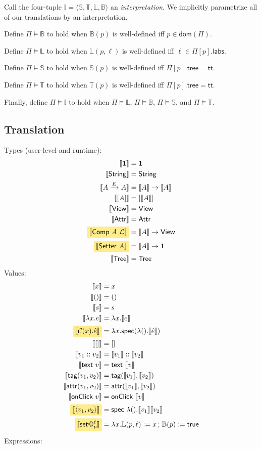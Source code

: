 \documentclass{article}
\makeatletter
\newcommand{\mf}[1]{\mathsf{#1}}
\newcommand{\mc}[1]{\mathcal{#1}}
\newcommand{\mb}[1]{\mathbf{#1}}
\newcommand{\semi}{\,;\,}
\newcommand{\dom}{\mf{dom}}
\newcommand{\mhl}[1]{\colorbox{LightGoldenrod1}{$#1$}}
\newcommand{\llrr}[1]{\llbracket #1 \rrbracket}
\newcommand{\pair}[2]{\langle #1, #2 \rangle}
\newcommand{\four}[4]{\langle #1, #2, #3, #4 \rangle}
\newcommand{\tone}{\mb{1}}
\newcommand{\tstr}{\mf{String}}
\newcommand{\tview}{\mf{View}}
\newcommand{\tattr}{\mf{Attr}}
\newcommand{\tcomp}[1]{\mf{Comp}\ #1}
\newcommand{\tset}[1]{\mf{Setter}\ #1}
\newcommand{\ttree}{\mf{Tree}}
\renewcommand{\tt}{\mf{tt}}
\newcommand{\C}{\mc{C}}
\newcommand{\vtxt}[1]{\mf{text}\ #1}
\newcommand{\vtag}[2]{\mf{tag}(#1, #2)}
\newcommand{\vattr}[2]{\mf{attr}(#1, #2)}
\newcommand{\vclick}[1]{\mf{onClick}\ #1}
\newcommand{\vset}[2]{\mf{set}@^{#1}_{#2}}
\newcommand{\Ell}{\mc{L}}
\newcommand{\I}{\mathbb{I}}
\newcommand{\eset}[2]{#1 := #2}
\makeatother
\begin{document}
Call the four-tuple
$\I=\four{\mathbb{S}}{\mathbb{T}}{\mathbb{L}}{\mathbb{B}}$
an \emph{interpretation}. We implicitly parametrize all of our
translations by an interpretation.

Define $\Pi \vDash \mathbb{B}$ to hold when
$\mathbb{B}(p)$ is well-defined iff $p \in \dom(\Pi)$.

Define $\Pi \vDash \mathbb{L}$ to hold when
$\mathbb{L}(p, \ell)$ is well-defined iff $\ell \in \Pi[p].\mf{labs}$.

Define $\Pi \vDash \mathbb{S}$ to hold when
$\mathbb{S}(p)$ is well-defined iff $\Pi[p].\mf{tree} = \tt$.

Define $\Pi \vDash \mathbb{T}$ to hold when
$\mathbb{T}(p)$ is well-defined iff $\Pi[p].\mf{tree} = \tt$.

Finally, define $\Pi \vDash \I$ to hold when
$\Pi \vDash \mathbb{L}$, $\Pi \vDash \mathbb{B}$,
$\Pi \vDash \mathbb{S}$, and $\Pi \vDash \mathbb{T}$.

\subsection{Translation}

Types (user-level and runtime):
\begin{align*}
\llrr{\tone} &= \tone\\
\llrr{\tstr} &= \tstr\\
\llrr{A \xrightarrow{E} A} &= \llrr{A} \rightarrow \llrr{A}\\
\llrr{[A]} &= [\llrr{A}]\\
\llrr{\tview} &= \tview\\
\llrr{\tattr} &= \tattr\\
\mhl{\llrr{\tcomp{A\ \Ell}}} &= \llrr{A} \rightarrow \tview\\
\mhl{\llrr{\tset{A}}} &= \llrr{A} \rightarrow \tone\\
\llrr{\ttree} &= \ttree
\end{align*}
Values:
\begin{align*}
\llrr{x} &= x\\
\llrr{()} &= ()\\
\llrr{s} &= s\\
\llrr{\lambda x.e} &= \lambda x.\llrr{e}\\
\mhl{\llrr{\C(x).\hat{e}}} &= \lambda x.\mf{spec}(
  \lambda ().\llrr{\hat{e}}
)\\
\llrr{[]} &= []\\
\llrr{v_1 :: v_2} &= \llrr{v_1} :: \llrr{v_2}\\
\llrr{\vtxt{v}} &= \vtxt{\llrr{v}}\\
\llrr{\vtag{v_1}{v_2}} &= \vtag{\llrr{v_1}}{\llrr{v_2}}\\
\llrr{\vattr{v_1}{v_2}} &= \vattr{\llrr{v_1}}{\llrr{v_2}}\\
\llrr{\vclick{v}} &= \vclick{\llrr{v}}\\
\mhl{\llrr{\pair{v_1}{v_2}}} 
&= \mf{spec}\ \lambda().\llrr{v_1} \llrr{v_2}\\
\mhl{\llrr{\vset{\ell}{p}}}
&= \lambda x. \eset{\mathbb{L}(p, \ell)}{x}
\semi \eset{\mathbb{B}(p)}{\mf{true}}
\end{align*}
Expressions:
\end{document}
